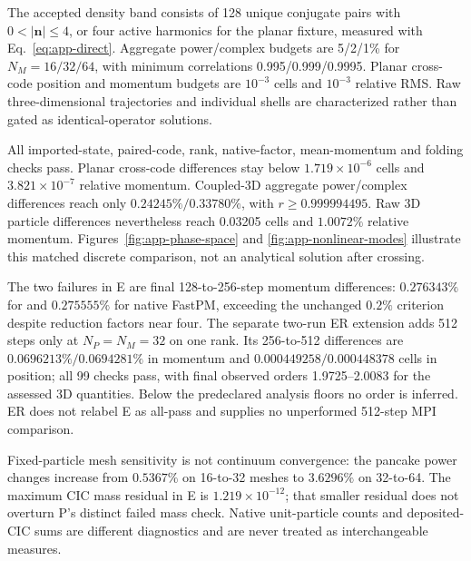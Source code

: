 The accepted density band consists of 128 unique conjugate pairs with
$0<|\boldsymbol n|\le4$, or four active harmonics for the planar fixture,
measured with Eq.~\eqref{eq:app-direct}.  Aggregate power/complex budgets are
5/2/1\% for $N_M=16/32/64$, with minimum correlations 0.995/0.999/0.9995.
Planar cross-code position and momentum budgets are $10^{-3}$ cells and
$10^{-3}$ relative RMS.  Raw three-dimensional trajectories and individual
shells are characterized rather than gated as identical-operator solutions.

All imported-state, paired-code, rank, native-factor, mean-momentum and folding
checks pass.  Planar cross-code differences stay below
$1.719\times10^{-6}$ cells and $3.821\times10^{-7}$ relative momentum.
Coupled-3D aggregate power/complex differences reach only
$0.24245\%/0.33780\%$, with $r\ge0.999994495$.
Raw 3D particle differences nevertheless reach 0.03205 cells and $1.0072\%$
relative momentum.  Figures~\ref{fig:app-phase-space} and
\ref{fig:app-nonlinear-modes} illustrate this matched discrete comparison,
not an analytical solution after crossing.

The two failures in E are final 128-to-256-step momentum differences:
$0.276343\%$ for \IPPL and $0.275555\%$ for native FastPM, exceeding the
unchanged $0.2\%$ criterion despite reduction factors near four.  The separate
two-run ER extension adds 512 steps only at $N_P=N_M=32$ on one rank.
Its 256-to-512 differences are $0.0696213\%/0.0694281\%$ in momentum and
$0.000449258/0.000448378$ cells in position; all 99 checks pass, with final
observed orders 1.9725--2.0083 for the assessed 3D quantities.  Below the
predeclared analysis floors no order is inferred.  ER does not relabel E as
all-pass and supplies no unperformed 512-step MPI comparison.

Fixed-particle mesh sensitivity is not continuum convergence: the pancake
power changes increase from $0.5367\%$ on 16-to-32 meshes to $3.6296\%$ on
32-to-64.  The maximum \IPPL CIC mass residual in E is
$1.219\times10^{-12}$; that smaller residual does not overturn P's distinct
failed mass check.  Native unit-particle counts and \IPPL deposited-CIC sums
are different diagnostics and are never treated as interchangeable measures.


